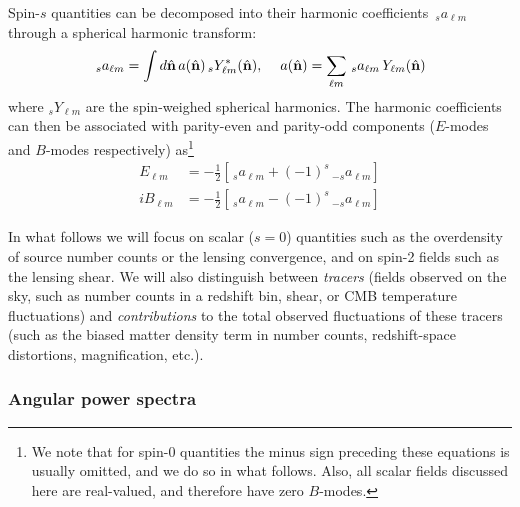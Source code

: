 \documentclass[\docopts]{\docclass}
\newcommand{\nv}{\hat{\bf n}}
\begin{document}
Spin-$s$ quantities can be decomposed into their harmonic coefficients $\,_sa_{\ell m}$ through a spherical harmonic transform:
\begin{equation}\nonumber
  \,_sa_{\ell m}=\int d\nv\,a(\nv)\,_sY^*_{\ell m}(\nv),\hspace{12pt}
  a(\nv)=\sum_{\ell m}\,_sa_{\ell m}\,Y_{\ell m}(\nv)
\end{equation}
where $_sY_{\ell m}$ are the spin-weighed spherical harmonics. The harmonic coefficients can then be associated with parity-even and parity-odd components ($E$-modes and $B$-modes respectively) as\footnote{We note that for spin-$0$ quantities the minus sign preceding these equations is usually omitted, and we do so in what follows. Also, all scalar fields discussed here are real-valued, and therefore have zero $B$-modes.}
\begin{align}\nonumber
   E_{\ell m}&=-\frac{1}{2}\left[\,_{s}a_{\ell m}+(-1)^s\,_{-s}a_{\ell m}\right]\\
  iB_{\ell m}&=-\frac{1}{2}\left[\,_{s}a_{\ell m}-(-1)^s\,_{-s}a_{\ell m}\right]
\end{align}

In what follows we will focus on scalar ($s=0$) quantities such as the overdensity of source number counts or the lensing convergence, and on spin-2 fields such as the lensing shear. We will also distinguish between {\sl tracers} (fields observed on the sky, such as number counts in a redshift bin, shear, or CMB temperature fluctuations) and {\sl contributions} to the total observed fluctuations of these tracers (such as the biased matter density term in number counts, redshift-space distortions, magnification, etc.).

\subsubsection{Angular power spectra}\label{sssec:2pt.pspec}
\end{document}
